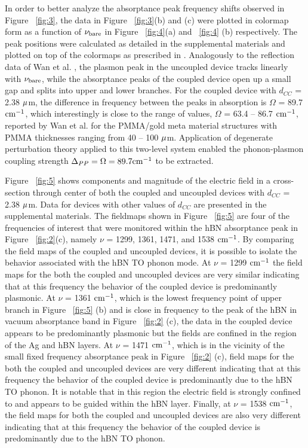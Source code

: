 \documentclass[
reprint,
amsmath,amssymb,
aip,
jap,
floatfix,
]{revtex4-2}
\begin{document}
    In order to better analyze the absorptance peak frequency shifts observed in Figure ~\ref{fig:3}, the data in Figure ~\ref{fig:3}(b) and (c) were plotted in colormap form as a function of $\nu_{\rm{bare}}$ in Figure ~\ref{fig:4}(a) and ~\ref{fig:4} (b) respectively. The peak positions were calculated as detailed in the supplemental materials and plotted on top of the colormaps as prescribed in \cite{Wan:16}. Analogously to the reflection data of Wan et al. \cite{Wan:16}, the plasmon peak in the uncoupled device tracks linearly with $\nu_{\rm{bare}}$, while the absorptance peaks of the coupled device open up a small gap and splits into upper and lower branches. For the coupled device with $d_{CC}$ = 2.38 $\rm \mu$m, the difference in frequency between the peaks in absorption is $\Omega$ = 89.7 $\rm cm^{-1}$, which interestingly is close to the range of values, $\Omega$ = 63.4 – 86.7 $\rm cm^{-1}$, reported by Wan et al. for the PMMA/gold meta material structures with PMMA thicknesses ranging from 40 – 100 $\rm \mu$m. Application of degenerate perturbation theory \cite{Sakurai:17} applied to this two-level system enabled the phonon-plasmon coupling strength $\Delta_{PP} = \rm  \Omega = 89.7 cm^{-1}$ to be extracted.

    Figure ~\ref{fig:5} shows components and magnitude of the electric field in a cross-section through center of both the coupled and uncoupled devices with $d_{CC}$  = 2.38 $\rm \mu$m. Data for devices with other values of $d_{CC}$  are presented in the supplemental materials. The fieldmaps shown in Figure ~\ref{fig:5} are four of the frequencies of interest that were monitored within the hBN absorptance peak in Figure ~\ref{fig:2}(c), namely $\nu$ = 1299, 1361, 1471, and 1538 $\rm cm^{-1}$. By comparing the field maps of the coupled and uncoupled devices, it is possible to isolate the behavior associated with the hBN TO phonon mode. At $\nu$ = 1299 $\rm cm^{-1}$ the field maps for the both the coupled and uncoupled devices are very similar indicating that at this frequency the behavior of the coupled device is predominantly plasmonic. At $\nu$ = 1361 $\rm cm^{-1}$, which is the lowest frequency point of upper branch in Figure ~\ref{fig:5} (b) and is close in frequency to the peak of the hBN in vacuum absorptance band in Figure ~\ref{fig:2} (c), the data in the coupled device appears to be predominantly plasmonic but the fields are confined in the region of the Ag and hBN layers. At $\nu$ = 1471 $\rm cm^{-1}$, which is in the vicinity of the small fixed frequency absorptance peak in Figure ~\ref{fig:2} (c), field maps for the both the coupled and uncoupled devices are very different indicating that at this frequency the behavior of the coupled device is predominantly due to the hBN TO phonon. It is notable that in this region the electric field is strongly confined to and appears to be guided within the hBN layer. Finally, at $\nu$ = 1538 $\rm cm^{-1}$, the field maps for both the coupled and uncoupled devices are also very different indicating that at this frequency the behavior of the coupled device is predominantly due to the hBN TO phonon.
\end{document}
